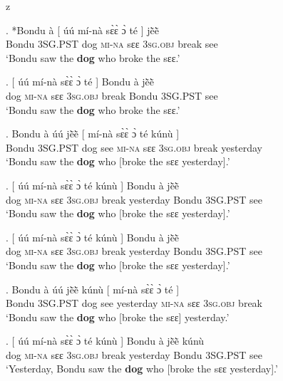 z   \documentclass{assets/fieldnotes}
\begin{document}
\exg. *Bondu à {[} úú mí-nà sɛ̀ɛ̀ ɔ̀ té {]} jẽ̀ẽ̀\\
Bondu \textsc{3SG.PST} {} dog \textsc{mi-na} sɛɛ \textsc{3sg.obj} break {} see\\
`Bondu saw the \textbf{dog} who broke the sɛɛ.’\\

\exg. {[} úú mí-nà sɛ̀ɛ̀ ɔ̀ té {]} Bondu à jẽ̀ẽ̀\\
{} dog \textsc{mi-na} sɛɛ \textsc{3sg.obj} break {} Bondu \textsc{3SG.PST} see\\
`Bondu saw the \textbf{dog} who broke the sɛɛ.’

\exg. Bondu à úú jẽ̀ẽ̀ {[} mí-nà sɛ̀ɛ̀ ɔ̀ té kúnù {]}\\
Bondu \textsc{3SG.PST} dog see {} \textsc{mi-na} sɛɛ \textsc{3sg.obj} break yesterday {}\\
`Bondu saw the \textbf{dog} who [broke the sɛɛ yesterday].’

\exg. {[} úú mí-nà sɛ̀ɛ̀ ɔ̀ té kúnù {]} Bondu à jẽ̀ẽ̀\\
{} dog \textsc{mi-na} sɛɛ \textsc{3sg.obj} break yesterday {} Bondu \textsc{3SG.PST} see\\
`Bondu saw the \textbf{dog} who [broke the sɛɛ yesterday].’

\exg. {[} úú mí-nà sɛ̀ɛ̀ ɔ̀ té kúnù {]} Bondu à jẽ̀ẽ̀\\
{} dog \textsc{mi-na} sɛɛ \textsc{3sg.obj} break yesterday {} Bondu \textsc{3SG.PST} see\\
`Bondu saw the \textbf{dog} who [broke the sɛɛ yesterday].’

\exg. Bondu à úú jẽ̀ẽ̀ kúnù {[} mí-nà sɛ̀ɛ̀ ɔ̀ té {]}\\
Bondu \textsc{3SG.PST} dog see yesterday {} \textsc{mi-na} sɛɛ \textsc{3sg.obj} break {}\\
`Bondu saw the \textbf{dog} who [broke the sɛɛ] yesterday.’

\exg. {[} úú mí-nà sɛ̀ɛ̀ ɔ̀ té kúnù {]} Bondu à jẽ̀ẽ̀ kúnù\\
{} dog \textsc{mi-na} sɛɛ \textsc{3sg.obj} break yesterday {} Bondu \textsc{3SG.PST} see\\
`Yesterday, Bondu saw the \textbf{dog} who [broke the sɛɛ yesterday].’

\end{document}
